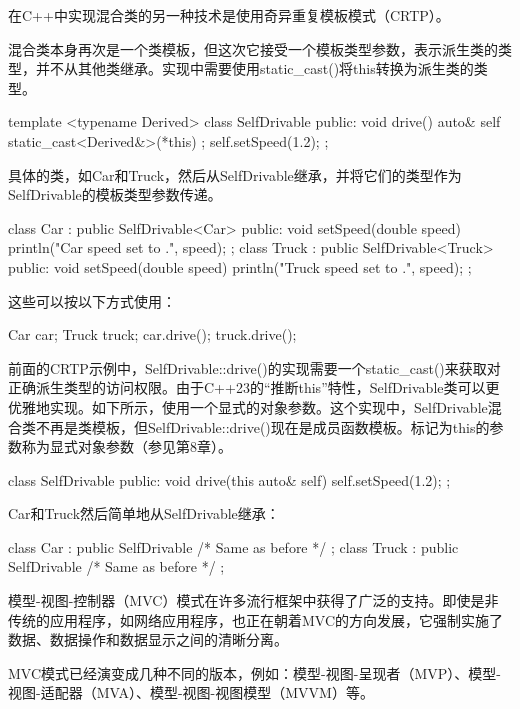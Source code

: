 
在C++中实现混合类的另一种技术是使用奇异重复模板模式（CRTP）。

混合类本身再次是一个类模板，但这次它接受一个模板类型参数，表示派生类的类型，并不从其他类继承。实现中需要使用static\_cast()将this转换为派生类的类型。

\begin{cpp}
template <typename Derived>
class SelfDrivable
{
    public:
        void drive()
        {
            auto& self { static_cast<Derived&>(*this) };
            self.setSpeed(1.2);
        }
};
\end{cpp}

具体的类，如Car和Truck，然后从SelfDrivable继承，并将它们的类型作为SelfDrivable的模板类型参数传递。

\begin{cpp}
class Car : public SelfDrivable<Car>
{
    public:
        void setSpeed(double speed) { println("Car speed set to {}.", speed); }
};
class Truck : public SelfDrivable<Truck>
{
    public:
        void setSpeed(double speed) { println("Truck speed set to {}.", speed); }
};
\end{cpp}

这些可以按以下方式使用：

\begin{shell}
Car car;
Truck truck;
car.drive();
truck.drive();
\end{shell}



前面的CRTP示例中，SelfDrivable::drive()的实现需要一个static\_cast()来获取对正确派生类型的访问权限。由于C++23的“推断this”特性，SelfDrivable类可以更优雅地实现。如下所示，使用一个显式的对象参数。这个实现中，SelfDrivable混合类不再是类模板，但SelfDrivable::drive()现在是成员函数模板。标记为this的参数称为显式对象参数（参见第8章）。

\begin{cpp}
class SelfDrivable
{
    public:
        void drive(this auto& self) { self.setSpeed(1.2); }
};
\end{cpp}

Car和Truck然后简单地从SelfDrivable继承：

\begin{cpp}
class Car : public SelfDrivable { /* Same as before */ };
class Truck : public SelfDrivable { /* Same as before */ };
\end{cpp}

模型-视图-控制器（MVC）模式在许多流行框架中获得了广泛的支持。即使是非传统的应用程序，如网络应用程序，也正在朝着MVC的方向发展，它强制实施了数据、数据操作和数据显示之间的清晰分离。

MVC模式已经演变成几种不同的版本，例如：模型-视图-呈现者（MVP）、模型-视图-适配器（MVA）、模型-视图-视图模型（MVVM）等。






